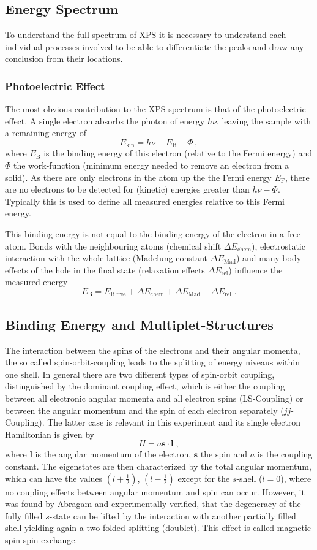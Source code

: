 \documentclass[a4paper]{scrartcl}
\numberwithin{equation}{section}
\numberwithin{figure}{section}
\numberwithin{table}{section}
\newcommand{\eq}[2]{\begin{equation}#1\label{#2}\end{equation}}
\newcommand{\ve}[1]{\mathbf{ #1} }
\begin{document}
\subsection{Energy Spectrum}
To understand the full spectrum of XPS it is necessary to understand each individual processes involved to be able to differentiate the peaks and draw any conclusion from their locations.


\subsubsection{Photoelectric Effect}
The most obvious contribution to the XPS spectrum is that of the photoelectric effect. A single electron absorbs the photon of energy $h\nu$, leaving the sample with a remaining energy of
\eq{E_\text{kin} = h\nu - E_\text{B} - \Phi \, ,}{}
where $E_\text{B}$ is the binding energy of this electron (relative to the Fermi energy) and $\Phi$ the work-function (minimum energy needed to remove an electron from a solid).
As there are only electrons in the atom up the the Fermi energy $E_\text{F}$, there are no electrons to be detected for (kinetic) energies greater than $h\nu -\Phi$. Typically this is used to define all measured energies relative to this Fermi energy.

This binding energy is not equal to the binding energy of the electron in a free atom. Bonds with the neighbouring atoms (chemical shift $\Delta E_\text{chem}$), electrostatic interaction with the whole lattice (Madelung constant $\Delta E_\text{Mad}$) and many-body effects of the hole in the final state (relaxation effects $\Delta E_\text{rel}$) influence the measured energy
\eq{E_\text{B}=E_\text{B,free} + \Delta E_\text{chem} + \Delta E_\text{Mad} + \Delta E_\text{rel} \; . }{}

\subsection{Binding Energy and Multiplet-Structures}
The interaction between the spins of the electrons and their angular momenta, the so called spin-orbit-coupling leads to the splitting of energy niveaus within one shell. In general there are two different types of spin-orbit coupling, distinguished by the dominant coupling effect, which is either the coupling between all electronic angular momenta and all electron spins (LS-Coupling) or between the angular momentum and the spin of each electron separately ($jj$-Coupling). The latter case is relevant in this experiment and its single electron Hamiltonian is given by
\eq{H=a \ve s \cdot \ve l\;,}{hamilton}
where $\ve l$ is the angular momentum of the electron, $\ve s$ the spin and $a$ is the coupling constant. The eigenstates are then characterized by the total angular momentum, which can have the values $(l+\tfrac 1 2)$, $(l - \tfrac 1 2)$ except for the $s$-shell ($l=0$), where no coupling effects between angular momentum and spin can occur. However, it was found by Abragam and experimentally verified, that the degeneracy of the fully filled $s$-state can be lifted by the interaction with another partially filled shell yielding again a two-folded splitting (doublet). This effect is called magnetic spin-spin exchange.
\end{document}
